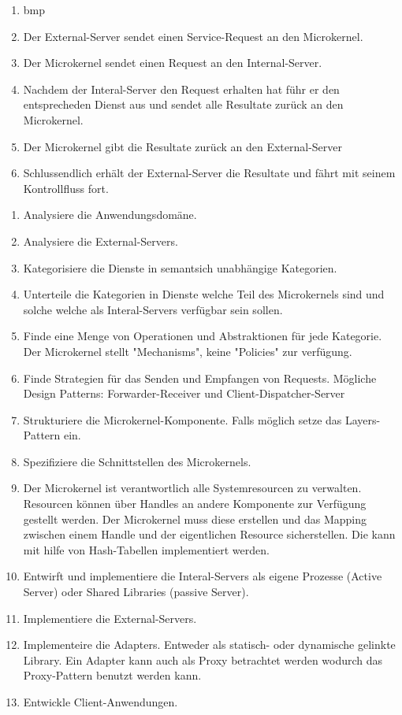 \begin{enumerate}
	\item bmp
	\item Der External-Server sendet einen Service-Request an den Microkernel.
	\item Der Microkernel sendet einen Request an den Internal-Server.
	\item Nachdem der Interal-Server den Request erhalten hat führ er den entsprecheden Dienst aus und sendet alle Resultate zurück an den Microkernel.
	\item Der Microkernel gibt die Resultate zurück an den External-Server
	\item Schlussendlich erhält der External-Server die Resultate und fährt mit seinem Kontrollfluss fort.
\end{enumerate}


\begin{enumerate}
	\item  Analysiere die Anwendungsdomäne.
	\item  Analysiere die External-Servers.
	\item  Kategorisiere die Dienste in semantsich unabhängige Kategorien.
	\item  Unterteile die Kategorien in Dienste welche Teil des Microkernels sind und solche welche als Interal-Servers verfügbar sein sollen.
	\item  Finde eine Menge von Operationen und Abstraktionen für jede Kategorie. Der Microkernel stellt "Mechanisms", keine "Policies" zur verfügung.
	\item  Finde Strategien für das Senden und Empfangen von Requests. Mögliche Design Patterns: Forwarder-Receiver und Client-Dispatcher-Server
	\item  Strukturiere die Microkernel-Komponente. Falls möglich setze das Layers-Pattern ein.
	\item  Spezifiziere die Schnittstellen des Microkernels.
	\item  Der Microkernel ist verantwortlich alle Systemresourcen zu verwalten. Resourcen können über Handles an andere Komponente zur Verfügung gestellt werden. Der Microkernel muss diese erstellen und das Mapping zwischen einem Handle und der eigentlichen Resource sicherstellen. Die kann mit hilfe von Hash-Tabellen implementiert werden.
	\item Entwirft und implementiere die Interal-Servers als eigene Prozesse (Active Server) oder Shared Libraries (passive Server).
	\item Implementiere die External-Servers.
	\item Implementeire die Adapters. Entweder als statisch- oder dynamische gelinkte Library. Ein Adapter kann auch als Proxy betrachtet werden wodurch das Proxy-Pattern benutzt werden kann.
	\item Entwickle Client-Anwendungen.
\end{enumerate}


